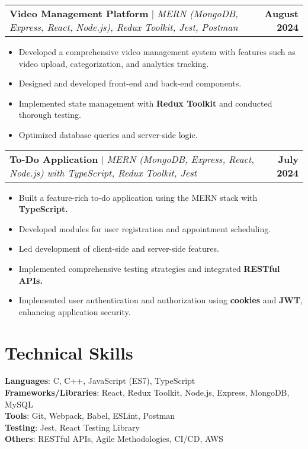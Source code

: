 \documentclass[letterpaper,11pt]{article}
\makeatletter
\newcommand{\resumeItem}[1]{
  \item\small{
    {#1 \vspace{-2pt}}
  }
}
\newcommand{\resumeProjectHeading}[2]{
    \item
    \begin{tabular*}{1.001\textwidth}{l@{\extracolsep{\fill}}r}
      \small#1 & \textbf{\small #2}\\
    \end{tabular*}\vspace{-7pt}
}
\newcommand{\resumeItemListStart}{\begin{itemize}}
\newcommand{\resumeItemListEnd}{\end{itemize}\vspace{-5pt}}
\makeatother
\begin{document}
    
\resumeProjectHeading
    {\textbf{Video Management Platform} $|$ \emph{MERN (MongoDB, Express, React, Node.js), Redux Toolkit, Jest, Postman}}{August 2024}
    \resumeItemListStart
        \resumeItem{Developed a comprehensive video management system with features such as video upload, categorization, and analytics tracking.}
        \resumeItem{Designed and developed front-end and back-end components.}
        \resumeItem{Implemented state management with \textbf{Redux Toolkit} and conducted thorough testing.}
        \resumeItem{Optimized database queries and server-side logic.}
    \resumeItemListEnd
    \vspace{-16pt}


    
\resumeProjectHeading
    {\textbf{To-Do Application} $|$ \emph{MERN (MongoDB, Express, React, Node.js) with TypeScript, Redux Toolkit, Jest}}{July 2024}
    \resumeItemListStart
        \resumeItem{Built a feature-rich to-do application using the MERN stack with \textbf{TypeScript.}}
        \resumeItem{Developed modules for user registration and appointment scheduling.}
        \resumeItem{Led development of client-side and server-side features.}
        \resumeItem{Implemented comprehensive testing strategies and integrated \textbf{RESTful APIs.}}
        \resumeItem{Implemented user authentication and authorization using \textbf{cookies} and \textbf{JWT}, enhancing application security.}
    \resumeItemListEnd
    \vspace{-16pt}



\section{Technical Skills}
 \begin{itemize}[leftmargin=0.15in, label={}]
    \small{
      \item{
        \textbf{Languages}{: C, C++, JavaScript (ES7), TypeScript} \\
        \textbf{Frameworks/Libraries}{: React, Redux Toolkit, Node.js, Express, MongoDB, MySQL} \\
        \textbf{Tools}{: Git, Webpack, Babel, ESLint, Postman} \\
        \textbf{Testing}{: Jest, React Testing Library} \\
        \textbf{Others}{: RESTful APIs, Agile Methodologies, CI/CD, AWS} \\
      }
    }
 \end{itemize}
 \vspace{-16pt}
\end{document}
